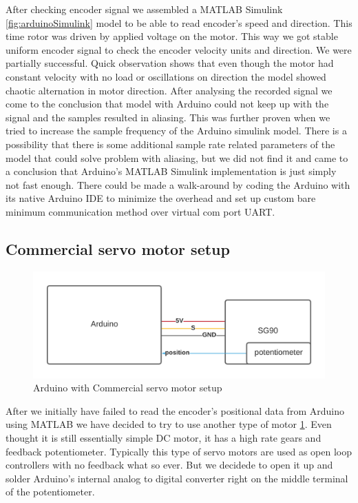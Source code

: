 \documentclass[]{final_report}
\begin{document}
After checking encoder signal we assembled a MATLAB Simulink \ref{fig:arduinoSimulink} model to be able to read encoder's speed and direction. This time rotor was driven by applied voltage on the motor. This way we got stable uniform encoder signal to check the encoder velocity units and direction. We were partially successful. Quick observation shows that even though the motor had constant velocity with no load or oscillations on direction the model showed chaotic alternation in motor direction. After analysing the recorded signal we come to the conclusion that model with Arduino could not keep up with the signal and the samples resulted in aliasing. This was further proven when we tried to increase the sample frequency of the Arduino simulink model. There is a possibility that there is some additional sample rate related parameters of the model that could solve problem with aliasing, but we did not find it and came to a conclusion that Arduino's MATLAB Simulink implementation is just simply not fast enough. There could be made a walk-around by coding the Arduino with its native Arduino IDE to minimize the overhead and set up custom bare minimum communication method over virtual com port UART.


\subsection{Commercial servo motor setup}

\begin{figure} [h!]
\centerline{\includegraphics[width=.75\textwidth]{Screenshots for paper/arduino/model 2/model2.png}}
\caption{Arduino with Commercial servo motor setup}
\label{fig:arduinoMotorSetupDiag2}
\end{figure}

After we initially have failed to read the encoder's positional data from Arduino using MATLAB we have decided to try to use another type of motor \ref{fig:arduinoMotorSetupDiag2}. Even thought it is still essentially simple DC motor, it has a high rate gears and feedback potentiometer. Typically this type of servo motors are used as open loop controllers with no feedback what so ever. But we decidede to open it up and solder Arduino's internal analog to digital converter right on the middle terminal of the potentiometer.
\end{document}
